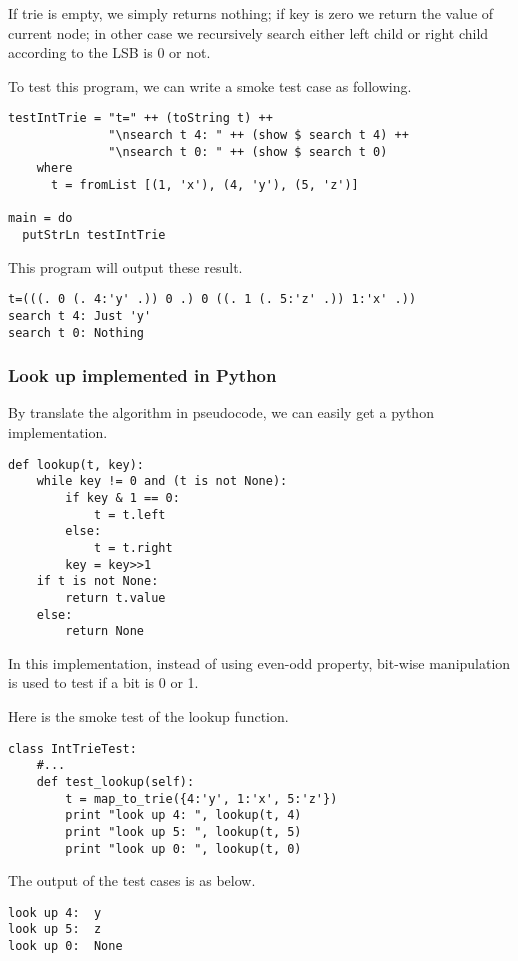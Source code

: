 \documentclass{article}
\begin{document}
If trie is empty, we simply returns nothing; if key is zero we return the 
value of current node; in other case we recursively search either left
child or right child according to the LSB is 0 or not.

To test this program, we can write a smoke test case as following.

\begin{lstlisting}
testIntTrie = "t=" ++ (toString t) ++ 
              "\nsearch t 4: " ++ (show $ search t 4) ++
              "\nsearch t 0: " ++ (show $ search t 0)
    where
      t = fromList [(1, 'x'), (4, 'y'), (5, 'z')]

main = do
  putStrLn testIntTrie
\end{lstlisting}

This program will output these result.

\begin{verbatim}
t=(((. 0 (. 4:'y' .)) 0 .) 0 ((. 1 (. 5:'z' .)) 1:'x' .))
search t 4: Just 'y'
search t 0: Nothing
\end{verbatim}

\subsubsection*{Look up implemented in Python}
By translate the algorithm in pseudocode, we can easily get a python 
implementation.

\lstset{language=Python}
\begin{lstlisting}
def lookup(t, key):
    while key != 0 and (t is not None):
        if key & 1 == 0:
            t = t.left
        else:
            t = t.right
        key = key>>1
    if t is not None:
        return t.value
    else:
        return None
\end{lstlisting}

In this implementation, instead of using even-odd property, bit-wise
manipulation is used to test if a bit is 0 or 1.

Here is the smoke test of the lookup function.

\begin{lstlisting}
class IntTrieTest:
    #...
    def test_lookup(self):
        t = map_to_trie({4:'y', 1:'x', 5:'z'})
        print "look up 4: ", lookup(t, 4)
        print "look up 5: ", lookup(t, 5)
        print "look up 0: ", lookup(t, 0)
\end{lstlisting}

The output of the test cases is as below.

\begin{verbatim}
look up 4:  y
look up 5:  z
look up 0:  None
\end{verbatim}
\end{document}
